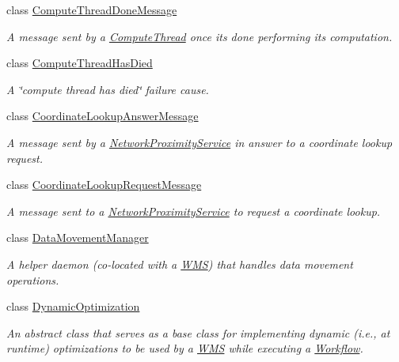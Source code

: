 \begin{DoxyCompactItemize}
class \hyperlink{classwrench_1_1_compute_thread_done_message}{Compute\+Thread\+Done\+Message}
\begin{DoxyCompactList}\small\item\em A message sent by a \hyperlink{classwrench_1_1_compute_thread}{Compute\+Thread} once it\textquotesingle{}s done performing its computation. \end{DoxyCompactList}\item 
class \hyperlink{classwrench_1_1_compute_thread_has_died}{Compute\+Thread\+Has\+Died}
\begin{DoxyCompactList}\small\item\em A \char`\"{}compute thread has died\char`\"{} failure cause. \end{DoxyCompactList}\item 
class \hyperlink{classwrench_1_1_coordinate_lookup_answer_message}{Coordinate\+Lookup\+Answer\+Message}
\begin{DoxyCompactList}\small\item\em A message sent by a \hyperlink{classwrench_1_1_network_proximity_service}{Network\+Proximity\+Service} in answer to a coordinate lookup request. \end{DoxyCompactList}\item 
class \hyperlink{classwrench_1_1_coordinate_lookup_request_message}{Coordinate\+Lookup\+Request\+Message}
\begin{DoxyCompactList}\small\item\em A message sent to a \hyperlink{classwrench_1_1_network_proximity_service}{Network\+Proximity\+Service} to request a coordinate lookup. \end{DoxyCompactList}\item 
class \hyperlink{classwrench_1_1_data_movement_manager}{Data\+Movement\+Manager}
\begin{DoxyCompactList}\small\item\em A helper daemon (co-\/located with a \hyperlink{classwrench_1_1_w_m_s}{W\+MS}) that handles data movement operations. \end{DoxyCompactList}\item 
class \hyperlink{classwrench_1_1_dynamic_optimization}{Dynamic\+Optimization}
\begin{DoxyCompactList}\small\item\em An abstract class that serves as a base class for implementing dynamic (i.\+e., at runtime) optimizations to be used by a \hyperlink{classwrench_1_1_w_m_s}{W\+MS} while executing a \hyperlink{classwrench_1_1_workflow}{Workflow}. \end{DoxyCompactList}\item 

\end{DoxyCompactItemize}
